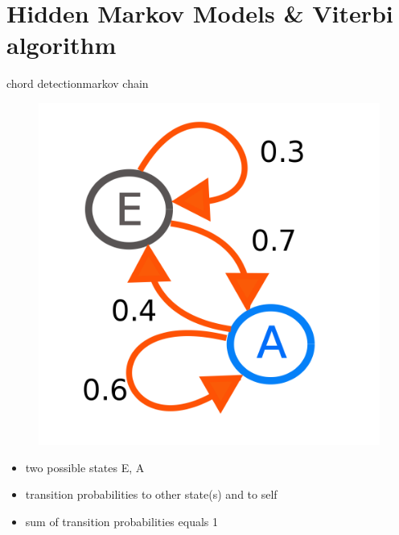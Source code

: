     \section[HMMs]{Hidden Markov Models \& Viterbi algorithm}
        \begin{frame}{chord detection}{markov chain}
            \begin{figure}
                \centering
                    \includegraphics[scale=.1]{graph/MarkovChain}
            \end{figure}
            \begin{itemize}
                \item   two possible states E, A
                \item   transition probabilities to other state(s) and to self
                \item   sum of transition probabilities equals 1
            \end{itemize}
        \end{frame}
        
